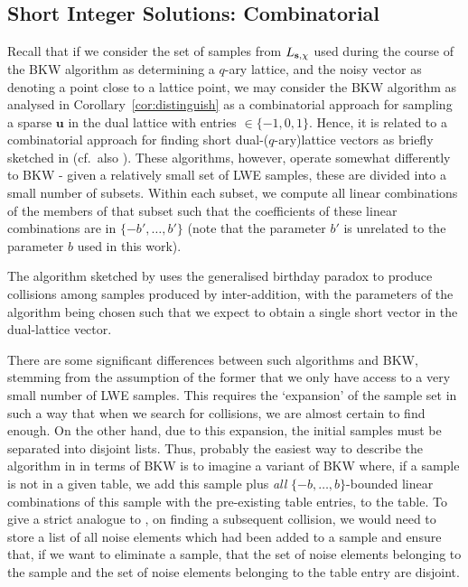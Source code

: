 \subsection{Short Integer Solutions: Combinatorial}
Recall that if we consider the set of samples from $L_{\mathbf{s},\chi}$ used during the course of the BKW algorithm as determining a $q$-ary lattice, and the noisy vector as denoting a point close to a lattice point, we may consider the BKW algorithm as analysed in Corollary~\ref{cor:distinguish} as a combinatorial approach for sampling a sparse $\mathbf{u}$ in the dual lattice with entries $\in \{-1,0,1\}$. Hence, it is related to a combinatorial approach for finding short dual-($q$-ary)lattice vectors as briefly sketched in \cite[p. 156]{micciancio-regev:pqc2009} (cf.\ also \cite{lyubashevsky-micciancio-peikert-rosen:fse2008}). These algorithms, however, operate somewhat differently to BKW - given a relatively small set of LWE samples, these are divided into a small number of subsets. Within each subset, we compute all linear combinations of the members of that subset such that the coefficients of these linear combinations are in $\{-b',\ldots,b'\}$ (note that the parameter $b'$ is unrelated to the parameter $b$ used in this work). 

The algorithm sketched by \cite{micciancio-regev:pqc2009} uses the generalised birthday paradox to produce collisions among samples produced by inter-addition, with the parameters of the algorithm being chosen such that we expect to obtain a single short vector in the dual-lattice vector.

There are some significant differences between such algorithms and BKW, stemming from the assumption of the former that we only have access to a very small number of LWE samples. This requires the `expansion' of the sample set in such a way that when we search for collisions, we are almost certain to find enough. On the other hand, due to this expansion, the initial samples must be separated into disjoint lists. Thus, probably the easiest way to describe the algorithm in \cite{micciancio-regev:pqc2009} in terms of BKW is to imagine a variant of BKW where, if a sample is not in a given table, we add this sample plus \emph{all} $\{-b,\ldots,b\}$-bounded linear combinations of this sample with the pre-existing table entries, to the table. To give a strict analogue to \cite{micciancio-regev:pqc2009}, on finding a subsequent collision, we would need to store a list of all noise elements which had been added to a sample and ensure that, if we want to eliminate a sample, that the set of noise elements belonging to the sample and the set of noise elements belonging to the table entry are disjoint.

